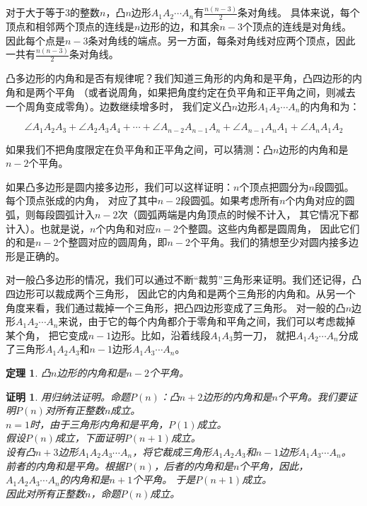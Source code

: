 \documentclass[12pt,UTF8]{ctexbook}
\newtheorem{tm}{定理}[section]
\newtheorem*{proof2}{证明}
\begin{document}
对于大于等于$3$的整数$n$，凸$n$边形$A_1A_2\cdots A_n$有$\frac{n(n-3)}{2}$条对角线。
具体来说，每个顶点和相邻两个顶点的连线是$n$边形的边，和其余$n-3$个顶点的连线是对角线。
因此每个点是$n-3$条对角线的端点。另一方面，每条对角线对应两个顶点，因此一共有$\frac{n(n-3)}{2}$条对角线。

凸多边形的内角和是否有规律呢？我们知道三角形的内角和是平角，凸四边形的内角和是两个平角
（或者说周角，如果把角度约定在负平角和正平角之间，则减去一个周角变成零角）。边数继续增多时，
我们定义凸$n$边形$A_1A_2\cdots A_n$的内角和为：

$$ \angle A_1A_2A_3 + \angle A_2A_3A_4 + \cdots + \angle A_{n-2}A_{n-1}A_{n} + \angle A_{n-1}A_{n}A_{1}+ \angle A_{n}A_{1}A_{2}$$

如果我们不把角度限定在负平角和正平角之间，可以猜测：凸$n$边形的内角和是$n-2$个平角。

如果凸多边形是圆内接多边形，我们可以这样证明：$n$个顶点把圆分为$n$段圆弧。每个顶点张成的内角，
对应了其中$n-2$段圆弧。如果考虑所有$n$个内角对应的圆弧，则每段圆弧计入$n-2$次（圆弧两端是内角顶点的时候不计入，
其它情况下都计入）。也就是说，$n$个内角和对应$n-2$个整圆。这些内角都是圆周角，
因此它们的和是$n-2$个整圆对应的圆周角，即$n-2$个平角。我们的猜想至少对圆内接多边形是正确的。

对一般凸多边形的情况，我们可以通过不断“裁剪”三角形来证明。我们还记得，凸四边形可以裁成两个三角形，
因此它的内角和是两个三角形的内角和。从另一个角度来看，我们通过裁掉一个三角形，把凸四边形变成了三角形。
对一般的凸$n$边形$A_1A_2\cdots A_n$来说，由于它的每个内角都介于零角和平角之间，我们可以考虑裁掉某个角，
把它变成$n-1$边形。比如，沿着线段$A_1A_3$剪一刀，
就把$A_1A_2\cdots A_n$分成了三角形$A_1A_2A_3$和$n-1$边形$A_1A_3\cdots A_n$。

\begin{tm}
    凸$n$边形的内角和是$n-2$个平角。
\end{tm}
\begin{proof2}
    用归纳法证明。命题$P(n)$：凸$n+2$边形的内角和是$n$个平角。我们要证明$P(n)$对所有正整数$n$成立。\\
    $n=1$时，由于三角形内角和是平角，$P(1)$成立。\\
    假设$P(n)$成立，下面证明$P(n+1)$成立。\\
    设有凸$n+3$边形$A_1A_2A_3\cdots A_n$，将它裁成三角形$A_1A_2A_3$和$n-1$边形$A_1A_3\cdots A_n$。
    前者的内角和是平角。根据$P(n)$，后者的内角和是$n$个平角，因此，$A_1A_2A_3\cdots A_n$的内角和是$n+1$个平角。
    于是$P(n+1)$成立。\\
    因此对所有正整数$n$，命题$P(n)$成立。
\end{proof2}
\end{document}
